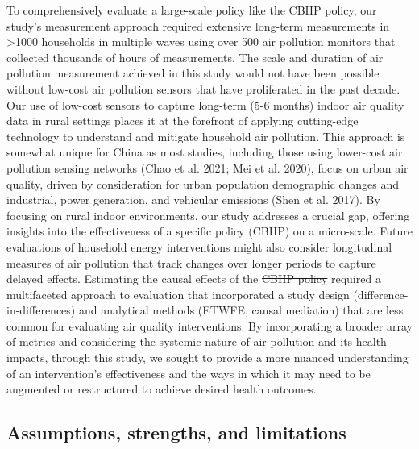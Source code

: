 \documentclass[
  letterpaper,
  DIV=11,
  numbers=noendperiod]{scrartcl}
\makeatletter
\providecommand{\DIFadd}[1]{{\protect\color{blue}\uwave{#1}}} %
\providecommand{\DIFdel}[1]{{\protect\color{red}\sout{#1}}} %
\providecommand{\DIFaddbegin}{} %
\providecommand{\DIFaddend}{} %
\providecommand{\DIFdelbegin}{} %
\providecommand{\DIFdelend}{} %
\newcommand{\DIFscaledelfig}{0.5}
\newlength{\DIFdelgraphicswidth} %
\newlength{\DIFdelgraphicsheight} %
\newcommand{\DIFaddincludegraphics}[2][]{{\color{blue}\fbox{\DIFOincludegraphics[#1]{#2}}}} %
\newcommand{\DIFdelincludegraphics}[2][]{%
\sbox{\DIFdelgraphicsbox}{\DIFOincludegraphics[#1]{#2}}%
\settoboxwidth{\DIFdelgraphicswidth}{\DIFdelgraphicsbox} %
\settoboxtotalheight{\DIFdelgraphicsheight}{\DIFdelgraphicsbox} %
\scalebox{\DIFscaledelfig}{%
\parbox[b]{\DIFdelgraphicswidth}{\usebox{\DIFdelgraphicsbox}\\[-\baselineskip] \rule{\DIFdelgraphicswidth}{0em}}\llap{\resizebox{\DIFdelgraphicswidth}{\DIFdelgraphicsheight}{%
\setlength{\unitlength}{\DIFdelgraphicswidth}%
\begin{picture}(1,1)%
\thicklines\linethickness{2pt} %
{\color[rgb]{1,0,0}\put(0,0){\framebox(1,1){}}}%
{\color[rgb]{1,0,0}\put(0,0){\line( 1,1){1}}}%
{\color[rgb]{1,0,0}\put(0,1){\line(1,-1){1}}}%
\end{picture}%
}\hspace*{3pt}}} %
} %
\DeclareRobustCommand{\DIFaddbegin}{\DIFOaddbegin \let\includegraphics\DIFaddincludegraphics} %
\DeclareRobustCommand{\DIFaddend}{\DIFOaddend \let\includegraphics\DIFOincludegraphics} %
\DeclareRobustCommand{\DIFdelbegin}{\DIFOdelbegin \let\includegraphics\DIFdelincludegraphics} %
\DeclareRobustCommand{\DIFdelend}{\DIFOaddend \let\includegraphics\DIFOincludegraphics} %
\let\sout@orig\sout %
\renewcommand{\sout}[1]{\ifmmode\text{\sout@orig{\ensuremath{#1}}}\else\sout@orig{#1}\fi} %
\makeatother
\begin{document}
To comprehensively evaluate a large-scale policy like the \DIFdelbegin \DIFdel{CBHP policy}\DIFdelend \DIFaddbegin \DIFadd{CHP}\DIFaddend , our
study's measurement approach required extensive long-term measurements
in \textgreater1000 households in multiple waves using over 500 air
pollution monitors that collected thousands of hours of measurements.
The scale and duration of air pollution measurement achieved in this
study would not have been possible without low-cost air pollution
sensors that have proliferated in the past decade. Our use of low-cost
sensors to capture long-term (5-6 months) indoor air quality data in
rural settings places it at the forefront of applying cutting-edge
technology to understand and mitigate household air pollution. This
approach is somewhat unique for China as most studies, including those
using lower-cost air pollution sensing networks (Chao et al. 2021; Mei
et al. 2020), focus on urban air quality, driven by consideration for
urban population demographic changes and industrial, power generation,
and vehicular emissions (Shen et al. 2017). By focusing on rural indoor
environments, our study addresses a crucial gap, offering insights into
the effectiveness of a specific policy (\DIFdelbegin \DIFdel{CBHP}\DIFdelend \DIFaddbegin \DIFadd{CHP}\DIFaddend ) on a micro-scale. Future
evaluations of household energy interventions might also consider
longitudinal measures of air pollution that track changes over longer
periods to capture delayed effects. Estimating the causal effects of the
\DIFdelbegin \DIFdel{CBHP policy }\DIFdelend \DIFaddbegin \DIFadd{CHP }\DIFaddend required a multifaceted approach to evaluation that incorporated a
study design (difference-in-differences) and analytical methods (ETWFE,
causal mediation) that are less common for evaluating air quality
interventions. By incorporating a broader array of metrics and
considering the systemic nature of air pollution and its health impacts,
through this study, we sought to provide a more nuanced understanding of
an intervention's effectiveness and the ways in which it may need to be
augmented or restructured to achieve desired health outcomes.

\subsection{Assumptions, strengths, and
limitations}\label{assumptions-strengths-and-limitations}
\end{document}
